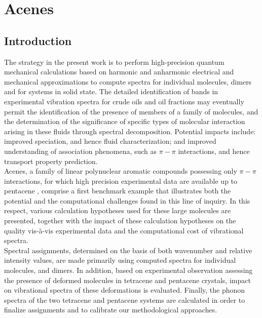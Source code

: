 \chapter[Phonon calculation]{Acenes}
\minitoc
\restoregeometry

\newpage

\section*{Introduction}

The strategy in the present work is to perform high-precision quantum mechanical calculations based on harmonic and anharmonic electrical and mechanical approximations to compute spectra for individual molecules, dimers and for systems in solid state.  The detailed identification of bands in experimental vibration spectra for crude oils and oil fractions may eventually permit the identification of the presence of members of a family of molecules, and the determination of the significance of specific types of molecular interaction arising in these fluids through spectral decomposition. Potential impacts include: improved speciation, and hence fluid characterization; and improved understanding of association phenomena, such as $\pi-\pi$ interactions, and hence transport property prediction.\\ 

Acenes, a family of linear polynuclear aromatic compounds possessing only $\pi-\pi$ interactions, for which high precision experimental data are available up to pentacene \cite{michaelian2012far}, comprise a first benchmark example that illustrates both the potential and the computational challenges found in this line of inquiry. In this respect, various calculation hypotheses used for these large molecules are presented, together with the impact of these calculation hypotheses on the quality vis-à-vis experimental data and the computational cost of vibrational spectra.\\

Spectral assignments, determined on the basis of both wavenumber and relative intensity values, are made primarily using computed spectra for individual molecules, and dimers. In addition, based on experimental observation assessing the presence of deformed molecules in tetracene and pentacene crystals, impact on vibrational spectra of these deformations is evaluated. Finally, the phonon spectra of the two tetracene and pentacene systems are calculated in order to finalize assignments and to calibrate our methodological approaches. \\

